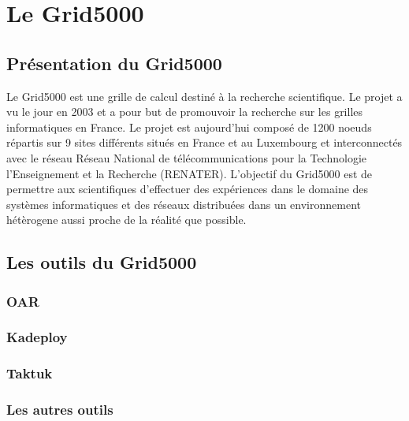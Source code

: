 \part{Le Grid5000}
\chapter{Présentation du Grid5000}
Le Grid5000 est une grille de calcul destiné à la recherche scientifique. Le projet a vu le jour en 2003 et a pour but de promouvoir la recherche sur les grilles informatiques en France. Le projet est aujourd'hui composé de 1200 noeuds répartis sur 9 sites différents situés en France et au Luxembourg et interconnectés avec le réseau Réseau National de télécommunications pour la Technologie l'Enseignement et la Recherche (RENATER). L'objectif du Grid5000 est de permettre aux scientifiques d'effectuer des expériences dans le domaine des systèmes informatiques et des réseaux distribuées dans un environnement hétèrogene aussi proche de la réalité que possible.\n

\chapter{Les outils du Grid5000}
\section{OAR}
\section{Kadeploy}
\section{Taktuk}
\section{Les autres outils}
